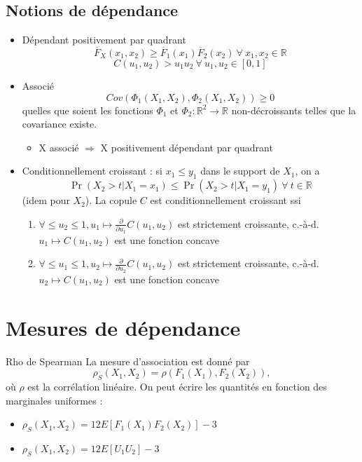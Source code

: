 \subsection{Notions de dépendance}

\begin{itemize}
	\item Dépendant positivement par quadrant 
	$$\overline{F}_X(x_1, x_2) \geq \overline{F}_1(x_1)\overline{F}_2(x_2) ~\forall~ x_1, x_2 \in \mathbb{R}$$
	$$C(u_1, u_2) > u_1 u_2 ~\forall~ u_1, u_2 \in [0, 1]$$
	\item Associé
	$$Cov\left(\Phi_1(X_1, X_2), \Phi_2(X_1, X_2)\right) \geq 0$$
	quelles que soient les fonctions $\Phi_1$ et $\Phi_2 : \mathbb{R}^2 \to \mathbb{R}$ non-décroissants telles que la covariance existe. 
	\begin{itemize}
		\item X associé $\Rightarrow$ X positivement dépendant par quadrant
	\end{itemize}
	\item Conditionnellement croissant : si $x_1 \leq y_1$ dans le support de $X_1$, on a 
	$$\Pr(X_2 > t \vert X_1 = x_1) \leq \Pr(X_2 > t \vert X_1 = y_1) ~ \forall~ t \in \mathbb{R}$$
	(idem pour $X_2$). La copule $C$ est conditionnellement croissant ssi 
	\begin{enumerate}[label=\roman*)]
		\item $\displaystyle \forall\leq u_2 \leq 1, u_1 \longmapsto \frac{\partial}{\partial u_1} C(u_1, u_2)$ est strictement croissante, c.-à-d. $u_1 \longmapsto C(u_1, u_2)$ est une fonction concave
		\item $\displaystyle \forall\leq u_1 \leq 1, u_2 \longmapsto \frac{\partial}{\partial u_2} C(u_1, u_2)$ est strictement croissante, c.-à-d. $u_2 \longmapsto C(u_1, u_2)$ est une fonction concave
	\end{enumerate}
\end{itemize}

\section{Mesures de dépendance}

\begin{definition}{Rho de Spearman}{}
	La mesure d'association est donné par 
	$$\rho_S\left(X_1, X_2\right) = \rho\left(F_1(X_1), F_2(X_2)\right),$$
	où $\rho$ est la corrélation linéaire. 
	\tcblower
	On peut écrire les quantités en fonction des marginales uniformes :
	\begin{itemize}
		\item $\displaystyle \rho_S(X_1, X_2) = 12E[F_1(X_1)F_2(X_2)] - 3$
		\item $\displaystyle \rho_S(X_1, X_2) = 12E[U_1U_2] - 3$
	\end{itemize}
\end{definition}

